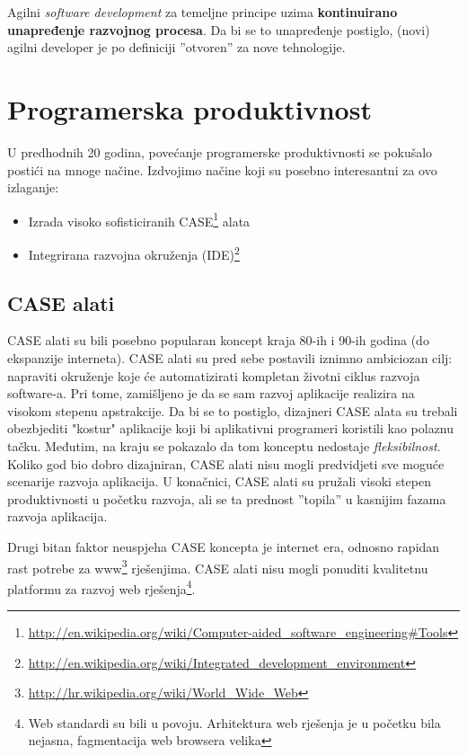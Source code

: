 \documentclass[times, utf8, seminar]{fit}
\begin{document}
Agilni \emph{software development} za temeljne principe uzima \textbf{kontinuirano unapređenje razvojnog procesa}. Da bi se to unapređenje postiglo, (novi) agilni developer je po definiciji ''otvoren'' za nove tehnologije.

\section{Programerska produktivnost}

U predhodnih 20 godina, povećanje programerske produktivnosti se pokušalo postići na mnoge načine. Izdvojimo načine koji su posebno interesantni za ovo izlaganje:

\begin{itemize}
  \item Izrada visoko sofisticiranih CASE\footnote{\url{http://en.wikipedia.org/wiki/Computer-aided_software_engineering#Tools}} alata
  \item Integrirana razvojna okruženja (IDE)\footnote{\url{http://en.wikipedia.org/wiki/Integrated_development_environment}} 
\end{itemize}

\subsection{CASE alati}

CASE alati su bili posebno popularan koncept kraja 80-ih i 90-ih godina (do ekspanzije interneta). CASE alati su pred sebe postavili iznimno ambiciozan cilj: napraviti okruženje koje će automatizirati kompletan životni ciklus razvoja software-a. Pri tome, zamišljeno je da se sam razvoj aplikacije realizira na visokom stepenu apstrakcije. Da bi se to postiglo, dizajneri CASE alata su trebali obezbjediti "kostur" aplikacije koji bi aplikativni programeri koristili kao polaznu tačku. Međutim, na kraju se pokazalo da tom konceptu nedostaje \emph{fleksibilnost}. Koliko god bio dobro dizajniran,  CASE alati nisu mogli predvidjeti sve moguće scenarije razvoja aplikacija. U konačnici, CASE alati su pružali visoki stepen produktivnosti u početku razvoja, ali se ta prednost ''topila'' u kasnijim fazama razvoja aplikacija. 

Drugi bitan faktor neuspjeha CASE koncepta je internet era, odnosno rapidan rast potrebe za www\footnote{\url{http://hr.wikipedia.org/wiki/World_Wide_Web}} rješenjima. CASE alati nisu mogli ponuditi kvalitetnu platformu za razvoj web rješenja\footnote{Web standardi su bili u povoju. Arhitektura web rješenja je u početku bila nejasna, fagmentacija web browsera velika}.
\end{document}
